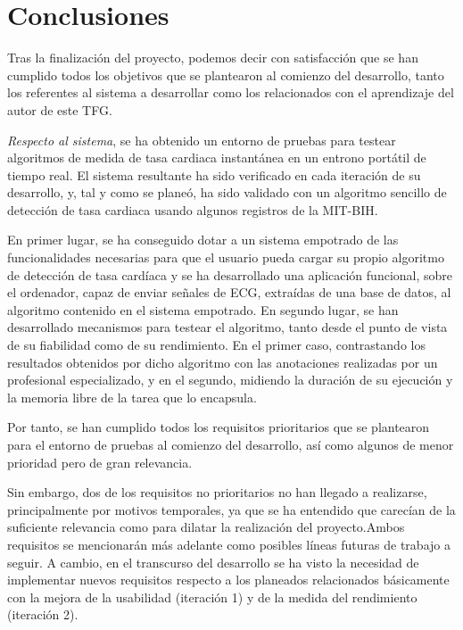 

\section{Conclusiones}

Tras la finalización del proyecto, podemos decir con satisfacción que se han cumplido todos los objetivos que se plantearon al comienzo del desarrollo, tanto los referentes al sistema a desarrollar como los relacionados con el aprendizaje del autor de este TFG.

\textit{Respecto al  sistema}, se ha obtenido un entorno de pruebas para testear algoritmos de medida de tasa cardiaca instantánea en un entrono portátil de tiempo real. El sistema resultante ha sido verificado en cada iteración de su desarrollo, y, tal y como se planeó, ha sido validado con un algoritmo sencillo de detección de tasa cardiaca usando algunos registros de la MIT-BIH.

En primer lugar, se ha conseguido dotar a un sistema empotrado de las funcionalidades necesarias para que el usuario pueda cargar su propio algoritmo de detección de tasa cardíaca y se ha desarrollado una aplicación funcional, sobre el ordenador, capaz de enviar señales de ECG, extraídas de una base de datos, al algoritmo contenido en el sistema empotrado. En segundo lugar, se han desarrollado  mecanismos para testear el algoritmo, tanto desde el punto de vista de su fiabilidad como de su rendimiento. En el primer caso, contrastando los resultados obtenidos por dicho algoritmo con las anotaciones realizadas por un profesional especializado, y en el segundo, midiendo la duración de su ejecución y la memoria libre de la tarea que lo encapsula. 

Por tanto, se han cumplido todos los requisitos prioritarios que se plantearon para el entorno de pruebas al comienzo del desarrollo, así como algunos de menor prioridad pero de gran relevancia. 

Sin embargo, dos de los requisitos no prioritarios no han llegado a realizarse, principalmente por motivos temporales, ya que se ha entendido que carecían de la suficiente relevancia como para dilatar la realización del proyecto.Ambos requisitos se mencionarán más adelante como posibles líneas futuras de trabajo a seguir. A cambio, en el transcurso del desarrollo se ha visto la necesidad de implementar nuevos requisitos respecto a los planeados relacionados básicamente con la mejora de la usabilidad (iteración 1) y de la medida del rendimiento (iteración 2). 

